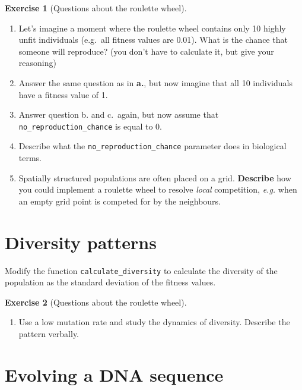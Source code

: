 \documentclass[
  letterpaper,
  DIV=11,
  numbers=noendperiod]{scrreprt}
\providecommand{\tightlist}{%
  \setlength{\itemsep}{0pt}\setlength{\parskip}{0pt}}\usepackage{longtable,booktabs,array}
\theoremstyle{definition}
\newtheorem{exercise}{Exercise}[chapter]
\theoremstyle{remark}
\begin{document}
\begin{exercise}[Questions about the roulette
wheel]\protect\hypertarget{exr-roulette}{}\label{exr-roulette}

\begin{enumerate}
\def\labelenumi{\alph{enumi}.}
\tightlist
\item
  Let's imagine a moment where the roulette wheel contains only 10
  highly unfit individuals (e.g.~all fitness values are 0.01). What is
  the chance that someone will reproduce? (you don't have to calculate
  it, but give your reasoning)
\item
  Answer the same question as in \textbf{a.}, but now imagine that all
  10 individuals have a fitness value of 1.
\item
  Answer question b. and c.~again, but now assume that
  \texttt{no\_reproduction\_chance} is equal to 0.
\item
  Describe what the \texttt{no\_reproduction\_chance} parameter does in
  biological terms.
\item
  Spatially structured populations are often placed on a grid.
  \textbf{Describe} how you could implement a roulette wheel to resolve
  \emph{local} competition, \emph{e.g.} when an empty grid point is
  competed for by the neighbours.
\end{enumerate}

\end{exercise}

\section{Diversity patterns}\label{diversity-patterns}

Modify the function \texttt{calculate\_diversity} to calculate the
diversity of the population as the standard deviation of the fitness
values.

\begin{exercise}[Questions about the roulette
wheel]\protect\hypertarget{exr-diversitydynamics}{}\label{exr-diversitydynamics}

\begin{enumerate}
\def\labelenumi{\alph{enumi}.}
\tightlist
\item
  Use a low mutation rate and study the dynamics of diversity. Describe
  the pattern verbally.
\end{enumerate}

\end{exercise}

\section{Evolving a DNA sequence}\label{evolving-a-dna-sequence}
\end{document}
